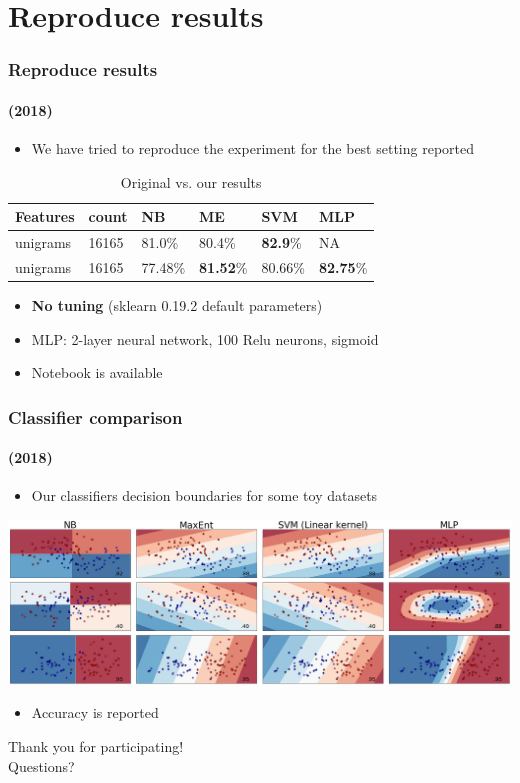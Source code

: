 \documentclass{beamer}
\begin{document}
\section{Reproduce results}
\begin{frame}
	\frametitle{Reproduce results}
	\framesubtitle{(2018)}
	\begin{itemize}
		\item We have tried to reproduce the experiment for the best setting reported
	\end{itemize}
	\begin{center}
		\begin{table}
			\begin{tabular}{l | l | l || l | l | l}
				Features & count & NB & ME & SVM & MLP\\ \hline \hline
				unigrams & 16165 & 81.0\% & 80.4\% & \textbf{82.9}\% & NA \\
				unigrams & 16165 & 77.48\% & \textbf{81.52}\% & 80.66\% & \textbf{82.75}\%  \\
			\end{tabular}
			\caption{Original vs. our results}
		\end{table}
	\end{center}
	\begin{itemize}
		\item \textbf{No tuning} (sklearn 0.19.2 default parameters)
		\item MLP: 2-layer neural network, 100 Relu neurons, sigmoid
		\item Notebook is available \href{https://github.com/dorcoh/sentiment-emnlp/blob/master/experiment/sentiment-analysis-emnlp2002.ipynb}{}
	\end{itemize}
\end{frame}

\begin{frame}
	\frametitle{Classifier comparison}
	\framesubtitle{(2018)}
	\begin{itemize}
		\item Our classifiers decision boundaries for some toy datasets
	\end{itemize}
	\begin{center}
		\includegraphics[scale=0.26]{comparison}
	\end{center}
	\begin{itemize}
		\item Accuracy is reported
	\end{itemize}
\end{frame}


\begin{frame}
	\centering
	\huge
	Thank you for participating! \\
	Questions?
\end{frame}
\end{document}
